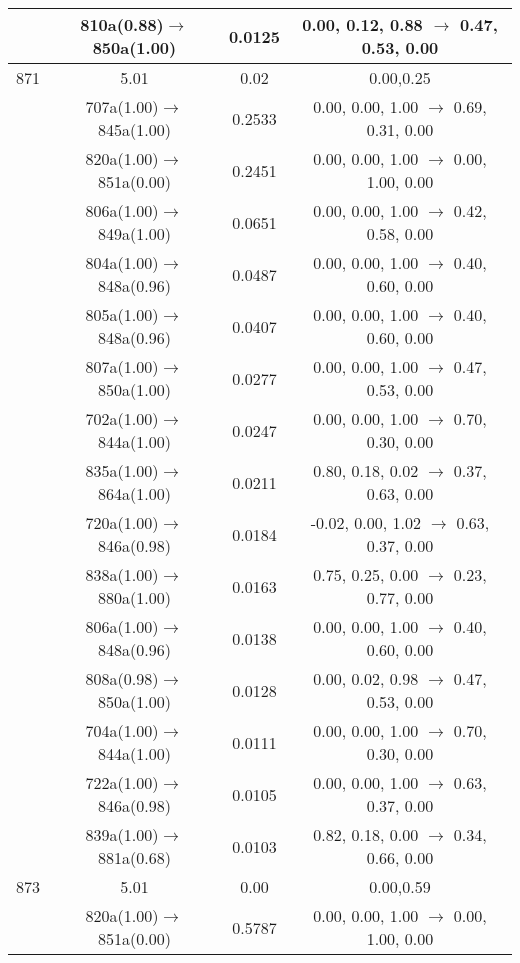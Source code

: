 \documentclass[10pt,a4paper]{article}
\begin{document}
\begin{longtable}{c|c|c|c}
 	& 810a(0.88)$\rightarrow$850a(1.00) &	 0.0125 &	 0.00, 0.12, 0.88 $\rightarrow$ 0.47, 0.53, 0.00 \\ 
 \hline871 &	 5.01 &	 0.02 &	 0.00,0.25 \\ 
  	& 707a(1.00)$\rightarrow$845a(1.00) &	 0.2533 &	 0.00, 0.00, 1.00 $\rightarrow$ 0.69, 0.31, 0.00 \\ 
 	& 820a(1.00)$\rightarrow$851a(0.00) &	 0.2451 &	 0.00, 0.00, 1.00 $\rightarrow$ 0.00, 1.00, 0.00 \\ 
 	& 806a(1.00)$\rightarrow$849a(1.00) &	 0.0651 &	 0.00, 0.00, 1.00 $\rightarrow$ 0.42, 0.58, 0.00 \\ 
 	& 804a(1.00)$\rightarrow$848a(0.96) &	 0.0487 &	 0.00, 0.00, 1.00 $\rightarrow$ 0.40, 0.60, 0.00 \\ 
 	& 805a(1.00)$\rightarrow$848a(0.96) &	 0.0407 &	 0.00, 0.00, 1.00 $\rightarrow$ 0.40, 0.60, 0.00 \\ 
 	& 807a(1.00)$\rightarrow$850a(1.00) &	 0.0277 &	 0.00, 0.00, 1.00 $\rightarrow$ 0.47, 0.53, 0.00 \\ 
 	& 702a(1.00)$\rightarrow$844a(1.00) &	 0.0247 &	 0.00, 0.00, 1.00 $\rightarrow$ 0.70, 0.30, 0.00 \\ 
 	& 835a(1.00)$\rightarrow$864a(1.00) &	 0.0211 &	 0.80, 0.18, 0.02 $\rightarrow$ 0.37, 0.63, 0.00 \\ 
 	& 720a(1.00)$\rightarrow$846a(0.98) &	 0.0184 &	 -0.02, 0.00, 1.02 $\rightarrow$ 0.63, 0.37, 0.00 \\ 
 	& 838a(1.00)$\rightarrow$880a(1.00) &	 0.0163 &	 0.75, 0.25, 0.00 $\rightarrow$ 0.23, 0.77, 0.00 \\ 
 	& 806a(1.00)$\rightarrow$848a(0.96) &	 0.0138 &	 0.00, 0.00, 1.00 $\rightarrow$ 0.40, 0.60, 0.00 \\ 
 	& 808a(0.98)$\rightarrow$850a(1.00) &	 0.0128 &	 0.00, 0.02, 0.98 $\rightarrow$ 0.47, 0.53, 0.00 \\ 
 	& 704a(1.00)$\rightarrow$844a(1.00) &	 0.0111 &	 0.00, 0.00, 1.00 $\rightarrow$ 0.70, 0.30, 0.00 \\ 
 	& 722a(1.00)$\rightarrow$846a(0.98) &	 0.0105 &	 0.00, 0.00, 1.00 $\rightarrow$ 0.63, 0.37, 0.00 \\ 
 	& 839a(1.00)$\rightarrow$881a(0.68) &	 0.0103 &	 0.82, 0.18, 0.00 $\rightarrow$ 0.34, 0.66, 0.00 \\ 
 \hline873 &	 5.01 &	 0.00 &	 0.00,0.59 \\ 
  	& 820a(1.00)$\rightarrow$851a(0.00) &	 0.5787 &	 0.00, 0.00, 1.00 $\rightarrow$ 0.00, 1.00, 0.00 \\ 

\end{longtable}
\end{document}

